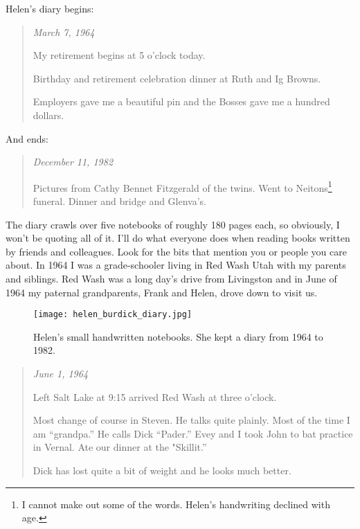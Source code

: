 Helen's diary begins:

\begin{quote}
\emph{March 7, 1964}

My retirement begins at 5 o'clock today.

Birthday and retirement celebration dinner at Ruth and Ig Browns.

Employers gave me a beautiful pin and the Bosses gave me a hundred
dollars.
\end{quote}

And ends:

\begin{quote}
\emph{December 11, 1982}

Pictures from Cathy Bennet Fitzgerald of the twins. Went to
Neitons\footnote{I cannot make out some of the words. Helen's handwriting declined with
  age.
} funeral. Dinner and bridge and Glenva's.
\end{quote}

The diary crawls over five notebooks of roughly 180 pages each, so
obviously, I won't be quoting all of it. I'll do what everyone does when
reading books written by friends and colleagues. Look for the bits that
mention you or people you care about. In 1964 I was a grade-schooler
living in Red Wash Utah with my parents and siblings. Red Wash was a
long day's drive from Livingston and in June of 1964 my paternal
grandparents, Frank and Helen, drove down to visit us.


\captionsetup[figure]{labelformat=empty}
\begin{SCfigure}[30]
\centering
\texttt{[image: helen\_burdick\_diary.jpg]}
\caption[Helen's small handwritten notebooks]{Helen's small handwritten notebooks. She kept a diary from 1964 to 1982.}
\label{fig:7491x1}
\end{SCfigure}
 

\begin{quote}
\emph{June 1, 1964}

Left Salt Lake at 9:15 arrived Red Wash at three o'clock. 

Most change of
course in Steven. He talks quite plainly. Most of the time I am
``grandpa.'' He calls Dick ``Pader.'' Evey and I took John to bat
practice in Vernal. Ate our dinner at the "Skillit.'' 

Dick has lost
quite a bit of weight and he looks much better.
\end{quote}

